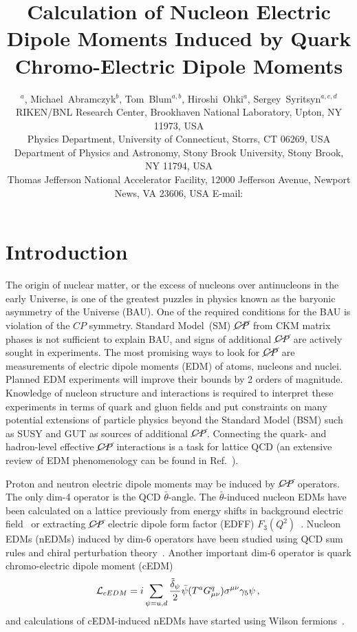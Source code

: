 \documentclass{PoS}
\title{Calculation of Nucleon Electric Dipole Moments 
  Induced by Quark Chromo-Electric Dipole Moments}
\author{
  \speaker{Taku Izubuchi}${}^{a}$,
  Michael~Abramczyk${}^{b}$,
  Tom~Blum${}^{a,b}$,
  Hiroshi~Ohki${}^{a}$,
  Sergey~Syritsyn${}^{a,c,d}$
  \\
  \llap{${}^a$} RIKEN/BNL Research Center, Brookhaven National Laboratory, 
      Upton, NY 11973, USA\\
  \llap{${}^b$} Physics Department, University of Connecticut, 
      Storrs, CT 06269, USA\\
  \llap{${}^c$} Department of Physics and Astronomy, Stony Brook University, 
      Stony Brook, NY 11794, USA \\
  \llap{${}^d$} Thomas Jefferson National Accelerator Facility, 12000 Jefferson Avenue, 
      Newport News, VA 23606, USA
E-mail: \email{izubuchi@quark.phy.bnl.gov}}
\newcommand{\CP}{{CP}}
\newcommand{\CPviol}{{\cancel{CP}}}
\newcommand{\mcL}{{\mathcal L}}
\begin{document}
\section{Introduction}
The origin of nuclear matter, or the excess of nucleons over antinucleons 
in the early Universe, is one of the greatest puzzles
in physics known as the baryonic asymmetry of the Universe (BAU).
One of the required conditions for the BAU is violation of the $\CP$ symmetry.
Standard Model~(SM) $\CPviol$ from CKM matrix phases is not sufficient to explain BAU,
and signs of additional $\CPviol$ are actively sought in experiments.
The most promising ways to look for $\CPviol$ are measurements of
electric dipole moments (EDM) of atoms, nucleons and nuclei. 
Planned EDM experiments will improve their bounds by 2 orders of magnitude.
Knowledge of nucleon structure and interactions is required to interpret these 
experiments in terms of quark and gluon fields and put constraints 
on many potential extensions of particle physics beyond the Standard Model (BSM) 
such as SUSY and GUT as sources of additional $\CPviol$.
Connecting the quark- and hadron-level effective $\CPviol$ 
interactions is a task for lattice QCD (an extensive
review of EDM phenomenology can be found in Ref.~\cite{Engel:2013lsa}).

Proton and neutron electric dipole moments may be induced by $\CPviol$ operators.
The only dim-4 operator is the QCD $\bar\theta$-angle.
The $\bar\theta$-induced nucleon EDMs have been calculated on a lattice previously 
from energy shifts in background electric 
field~\cite{Aoki:1989rx,Shintani:2006xr,Shintani:2008nt}
or extracting $\CPviol$ electric dipole form factor (EDFF) $F_3(Q^2)$~\cite{
Berruto:2005hg,Shintani:2005xg,
Shindler:2015aqa,
Shintani:2015vsx,Alexandrou:2015spa}.
%
Nucleon EDMs (nEDMs) induced by dim-6 operators have been studied using QCD sum rules and chiral
perturbation theory~\cite{Engel:2013lsa}.
Another important dim-6 operator is quark chromo-electric dipole moment (cEDM)
\begin{equation}
\label{eqn:qcedm}
\mcL_{cEDM} = i \sum_{\psi=u,d} \frac{\tilde\delta_\psi}{2}
    \bar\psi (T^a G^q_{\mu\nu}) \sigma^{\mu\nu}\gamma_5 \psi\,,\\
\end{equation}
and calculations of cEDM-induced nEDMs have started using Wilson
fermions~\cite{Bhattacharya:2016oqm}.
\end{document}
